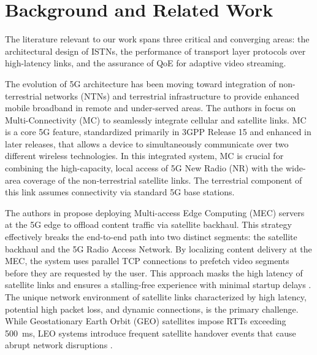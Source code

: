 \documentclass[journal]{IEEEtran}
\begin{document}
\section*{Background and Related Work}

The literature relevant to our work spans three critical and converging areas: the architectural design of ISTNs, the performance of transport layer protocols over high-latency links, and the assurance of QoE for adaptive video streaming.

The evolution of 5G architecture has been moving toward integration of non-terrestrial networks (NTNs) and terrestrial infrastructure to provide enhanced mobile broadband in remote and under-served areas. The authors in \cite{Kim2019} focus on Multi-Connectivity (MC) to seamlessly integrate cellular and satellite links. MC is a core 5G feature, standardized primarily in 3GPP Release 15 and enhanced in later releases, that allows a device to simultaneously communicate over two different wireless technologies. In this integrated system, MC is crucial for combining the high-capacity, local access of 5G New Radio (NR) with the wide-area coverage of the non-terrestrial satellite links. The terrestrial component of this link assumes connectivity via standard 5G base stations.

The authors in \cite{Ge2019} propose deploying Multi-access Edge Computing (MEC) servers at the 5G edge to offload content traffic via satellite backhaul. This strategy effectively breaks the end-to-end path into two distinct segments: the satellite backhaul and the 5G Radio Access Network. By localizing content delivery at the MEC, the system uses parallel TCP connections to prefetch video segments before they are requested by the user. This approach masks the high latency of satellite links and ensures a stalling-free experience with minimal startup delays \cite{Ge2019, Wang2018}. 
The unique network environment of satellite links characterized by high latency, potential high packet loss, and dynamic connections, is the primary challenge. While Geostationary Earth Orbit (GEO) satellites impose RTTs exceeding 500~ms, LEO systems introduce frequent satellite handover events that cause abrupt network disruptions \cite{Fang2024}.

\end{document}
